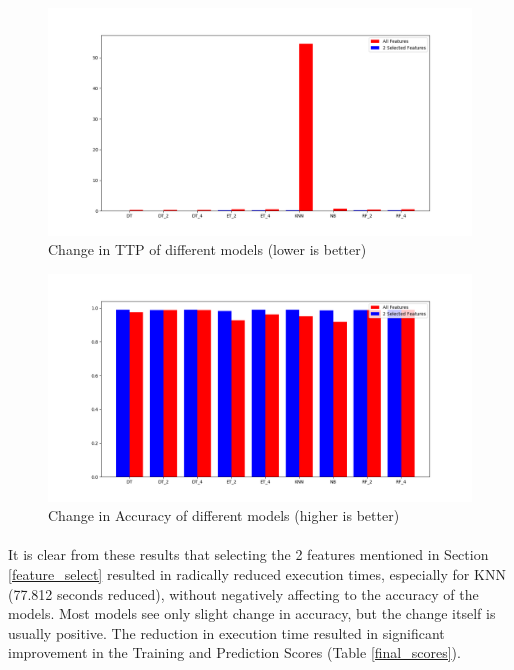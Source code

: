 \begin{figure}[h]
    \hfill\includegraphics[width=1\textwidth]{Chapter4/ttp_improvement}\hspace*{\fill}
    \caption{Change in TTP of different models (lower is better)}
    \label{ttp_improvement}
\end{figure}

\begin{figure}[h]
    \hfill\includegraphics[width=1\textwidth]{Chapter4/acc_improvement}\hspace*{\fill}
    \caption{Change in Accuracy of different models (higher is better)}
    \label{acc_improvement}
\end{figure}

\paragraph{}
It is clear from these results that selecting the 2 features mentioned in Section \ref{feature_select} resulted in radically reduced execution times, especially for KNN (77.812 seconds reduced), without negatively affecting to the accuracy of the models. Most models see only slight change in accuracy, but the change itself is usually positive. The reduction in execution time resulted in significant improvement in the Training and Prediction Scores (Table \ref{final_scores}).

